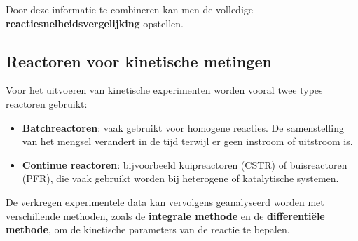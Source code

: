 \documentclass{ximera}
\begin{document}
Door deze informatie te combineren kan men de volledige
\textbf{reactiesnelheidsvergelijking} opstellen.

\subsection*{Reactoren voor kinetische metingen}

Voor het uitvoeren van kinetische experimenten worden vooral twee types reactoren gebruikt:

\begin{itemize}
\item \textbf{Batchreactoren}: vaak gebruikt voor homogene reacties. De samenstelling
van het mengsel verandert in de tijd terwijl er geen instroom of uitstroom is.
\item \textbf{Continue reactoren}: bijvoorbeeld kuipreactoren (CSTR) of buisreactoren
(PFR), die vaak gebruikt worden bij heterogene of katalytische systemen.
\end{itemize}

De verkregen experimentele data kan vervolgens geanalyseerd worden met verschillende
methoden, zoals de \textbf{integrale methode} en de \textbf{differentiële methode},
om de kinetische parameters van de reactie te bepalen.
\end{document}
